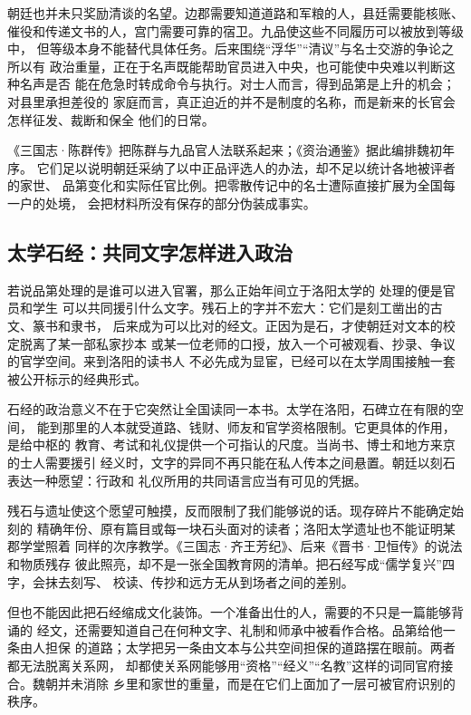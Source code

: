 朝廷也并未只奖励清谈的名望。边郡需要知道道路和军粮的人，县廷需要能核账、
催役和传递文书的人，宫门需要可靠的宿卫。九品使这些不同履历可以被放到等级中，
但等级本身不能替代具体任务。后来围绕“浮华”“清议”与名士交游的争论之所以有
政治重量，正在于名声既能帮助官员进入中央，也可能使中央难以判断这种名声是否
能在危急时转成命令与执行。对士人而言，得到品第是上升的机会；对县里承担差役的
家庭而言，真正迫近的并不是制度的名称，而是新来的长官会怎样征发、裁断和保全
他们的日常。

\begin{sourcenote}
《三国志·陈群传》把陈群与九品官人法联系起来；《资治通鉴》据此编排魏初年序。
它们足以说明朝廷采纳了以中正品评选人的办法，却不足以统计各地被评者的家世、
品第变化和实际任官比例。把零散传记中的名士遭际直接扩展为全国每一户的处境，
会把材料所没有保存的部分伪装成事实。
\end{sourcenote}

\subsection{太学石经：共同文字怎样进入政治}

若说品第处理的是谁可以进入官署，那么正始年间立于洛阳太学的
处理的便是官员和学生
可以共同援引什么文字。残石上的字并不宏大：它们是刻工凿出的古文、篆书和隶书，
后来成为可以比对的经文。正因为是石，才使朝廷对文本的校定脱离了某一部私家抄本
或某一位老师的口授，放入一个可被观看、抄录、争议的官学空间。来到洛阳的读书人
不必先成为显宦，已经可以在太学周围接触一套被公开标示的经典形式。

石经的政治意义不在于它突然让全国读同一本书。太学在洛阳，石碑立在有限的空间，
能到那里的人本就受道路、钱财、师友和官学资格限制。它更具体的作用，是给中枢的
教育、考试和礼仪提供一个可指认的尺度。当尚书、博士和地方来京的士人需要援引
经义时，文字的异同不再只能在私人传本之间悬置。朝廷以刻石表达一种愿望：行政和
礼仪所用的共同语言应当有可见的凭据。

残石与遗址使这个愿望可触摸，反而限制了我们能够说的话。现存碎片不能确定始刻的
精确年份、原有篇目或每一块石头面对的读者；洛阳太学遗址也不能证明某郡学堂照着
同样的次序教学。《三国志·齐王芳纪》、后来《晋书·卫恒传》的说法和物质残存
彼此照亮，却不是一张全国教育网的清单。把石经写成“儒学复兴”四字，会抹去刻写、
校读、传抄和远方无从到场者之间的差别。

但也不能因此把石经缩成文化装饰。一个准备出仕的人，需要的不只是一篇能够背诵的
经文，还需要知道自己在何种文字、礼制和师承中被看作合格。品第给他一条由人担保
的道路；太学把另一条由文本与公共空间担保的道路摆在眼前。两者都无法脱离关系网，
却都使关系网能够用“资格”“经义”“名教”这样的词同官府接合。魏朝并未消除
乡里和家世的重量，而是在它们上面加了一层可被官府识别的秩序。

